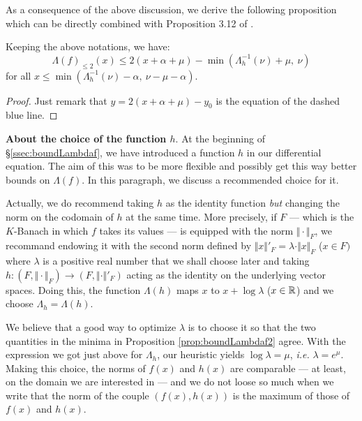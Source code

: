 \documentclass{sig-alternate}
\begin{document}
As a consequence of the above discussion, we derive the following 
proposition which can be directly combined with Proposition 3.12 of 
\cite{caruso-roe-vaccon:14a}.

\begin{prop}
\label{prop:boundLambdaf2}
Keeping the above notations, we have:
$$\Lambda(f)_{\leq 2} (x) \leq 2(x + \alpha + \mu) -
\min(\Lambda_h^{-1}(\nu) + \mu, \: \nu)$$
for all $x \leq \min(\Lambda_h^{-1}(\nu) - \alpha, \: \nu - \mu - \alpha)$.
\end{prop}

\begin{proof}
Just remark that $y = 2(x + \alpha + \mu) - y_0$ is the equation of 
the dashed blue line.
\end{proof}

\noindent
{\bf About the choice of the function $h$}.
At the beginning of \S \ref{ssec:boundLambdaf}, we have introduced a 
function $h$ in our differential equation. The aim of this was to be 
more flexible and possibly get this way better bounds on $\Lambda(f)$. 
In this paragraph, we discuss a recommended choice for it.

Actually, we do recommend taking $h$ as the identity function 
\emph{but} changing the norm on the codomain of $h$ at the same time.
More precisely, if $F$ --- which is the $K$-Banach in which $f$ takes
its values --- is equipped with the norm $\Vert \cdot \Vert_F$, we 
recommand endowing it with the second norm defined by
$\Vert x \Vert'_F = \lambda \cdot \Vert x \Vert_F$ ($x \in F)$
where $\lambda$ is a positive real number that we shall choose later 
and taking $h : (F, \Vert \cdot \Vert_F) \to (F, \Vert \cdot \Vert'_F)$ 
acting as the identity on the underlying vector spaces. Doing this, the 
function $\Lambda(h)$ maps $x$ to $x + \log \lambda$ ($x \in \mathbb R$) and we 
choose $\Lambda_h = \Lambda(h)$.

We believe that a good way to optimize $\lambda$ is to choose it so that 
the two quantities in the minima in Proposition \ref{prop:boundLambdaf2} 
agree. With the expression we got just above for $\Lambda_h$, our 
heuristic yields $\log \lambda = \mu$, \emph{i.e.} $\lambda = e^\mu$.
Making this choice, the norms of $f(x)$ and $h(x)$ are comparable --- 
at least, on the domain we are interested in --- and we do not loose so 
much when we write that the norm of the couple $(f(x), h(x))$ is the 
maximum of those of $f(x)$ and $h(x)$.
\end{document}
